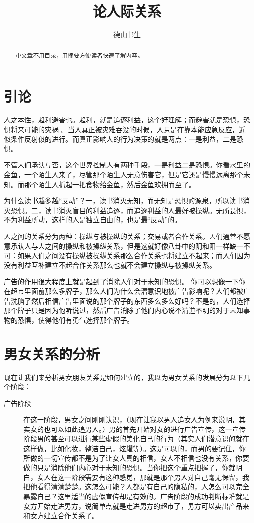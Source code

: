 \documentclass[11pt,oneside]{article}
\begin{document}
\title{论人际关系}
\author{德山书生}
\date{}
\maketitle

\begin{abstract}
小文章不用目录，用摘要方便读者快速了解内容。
\end{abstract}


\begin{common-format}

\section{引论}
人之本性，趋利避害也。趋利，就是追逐利益，这个好理解；而避害就是恐惧，恐惧将来可能的灾祸 。当人真正被灾难吞没的时候，人只是在靠本能应急反应，近似条件反射似的进行。而真正影响人的行为决策的就是两点：一是利益，二是恐惧。

不管人们承认与否，这个世界控制人有两种手段，一是利益二是恐惧。你看水里的金鱼，一个陌生人来了，尽管那个陌生人无意伤害它，但是它还是慢慢远离那个未知。而那个陌生人抓起一把食物给金鱼，然后金鱼欢拥而至了。

为什么读书越多越“反动”？一，读书消灭无知，而无知是恐惧的源泉，所以读书消灭恐惧。二，读书消灭盲目的利益追逐，而追逐利益的人最好被操纵。无所畏惧，不为利益所动，这样的人是独立自由的，也是最“反动”的。﻿

人之间的关系分为两种：操纵与被操纵的关系；交易或者合作关系。人们通常不愿意承认人与人之间的操纵和被操纵关系，但是这就好像八卦中的阴和阳一样缺一不可：如果人们之间没有操纵被操纵关系那么合作关系也将建立不起来；而人们因为没有利益互补建立不起合作关系那么也就不会建立操纵与被操纵关系。

广告的作用很大程度上就是起到了消除人们对于未知的恐惧。 你可以想像一下你在超市里面前那么多牌子，那么人们为什么会潜意识地被广告影响呢？人们都被广告洗脑了然后相信广告里面说的那个牌子的东西多么多么好吗？不是的，人们选择那个牌子只是因为他听说过，然后广告消除了他们内心说不清道不明的对于未知事物的恐惧，使得他们有勇气选择那个牌子。

\section{男女关系的分析}
现在让我们来分析男女朋友关系是如何建立的，我以为男女关系的发展分为以下几个阶段：
\begin{description}
\item[广告阶段] 在这一阶段，男女之间刚刚认识，（现在让我以男人追女人为例来说明，其实女的也可以如此追男人。）男的首先开始对女的进行广告宣传，这一宣传阶段男的甚至可以进行某些虚假的美化自己的行为（其实人们潜意识的就在这样做，比如化妆，整洁自己，炫耀等）。这是可以的，而男的要记住，你所做的一切宣传都不是为了让女人真的相信，女人不相信也没有关系，你要做的只是消除他们内心对于未知的恐惧。当你把这个重点把握了，你就明白，女人在这一阶段需要有这种感觉，那就是那个男人对自己毫无保留，我把他看得清清楚楚。这怎么可能？人都是有自己的隐私的，人怎么可以完全暴露自己？这里适当的虚假宣传却是有效的。广告阶段的成功判断标准就是女方开始走进男方，说简单点就是走进男方的超市了，男方可以卖出产品来和女方建立合作关系了。


\end{description}
\end{common-format}
\end{document}
